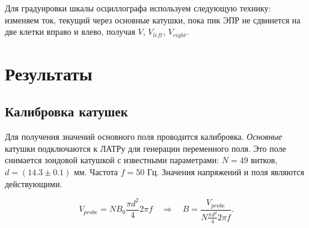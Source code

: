 \documentclass[12pt,a4paper]{article}
\begin{document}
	Для градуировки шкалы осциллографа используем следующую технику: изменяем ток, текущий через основные катушки, пока пик ЭПР не сдвинется на две клетки вправо и влево, получая $V$, $V_{left}$, $V_{right}$.

	\section*{Результаты}
	
	\subsection*{Калибровка катушек}
	
	Для получения значений основного поля проводится калибровка. \textit{Основные} катушки подключаются к ЛАТРу для генерации переменного поля. Это поле снимается зондовой катушкой с известными параметрами: $N = 49$ витков, $d = (14.3 \pm 0.1)$ мм. Частота $f = 50$ Гц. Значения напряжений и поля являются действующими.
	
	$$V_{probe} = N B_0 \frac{\pi d^2}{4} 2 \pi f \quad \Rightarrow \quad B = \frac{V_{probe}}{N \frac{\pi d^2}{4} 2 \pi f}.$$
	
\end{document}
